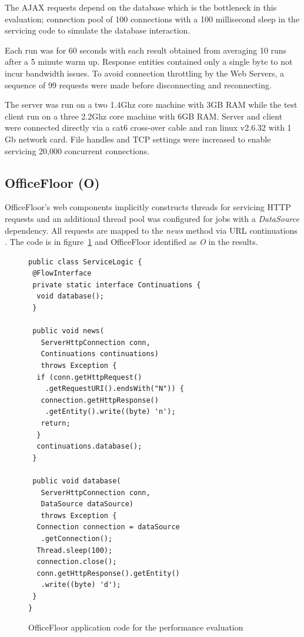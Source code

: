\documentclass[conference]{ieee/IEEEtran}
\begin{document}
The AJAX requests depend on the database which is the bottleneck in this
evaluation; connection pool of 100 connections with a 100 millisecond sleep in
the servicing code to simulate the database interaction.

Each run was for 60 seconds with each result obtained from averaging 10 runs
after a 5 minute warm up.  Response entities contained only a single byte to not
incur bandwidth issues.  To avoid connection throttling by the Web Servers, a
sequence of 99 requests were made before disconnecting and reconnecting.

The server was run on a two 1.4Ghz core machine with 3GB RAM while the test
client run on a three 2.2Ghz core machine with 6GB RAM.  Server and client were
connected directly via a cat6 cross-over cable and ran linux v2.6.32 with 1 Gb
network card.  File handles and TCP settings were increased to enable servicing
20,000 concurrent connections.

\subsection{OfficeFloor (O)}
OfficeFloor's web components implicitly constructs threads for servicing HTTP
requests and an additional thread pool was configured for jobs with a
\textit{DataSource} dependency.  All requests are mapped to the \textit{news}
method via URL continuations \cite{url-continuation}.  The code is in
figure~\ref{fig:officefloor_code} and OfficeFloor identified as \textit{O} in
the results.

\begin{figure}[!t]
\begin{verbatim}
public class ServiceLogic {
 @FlowInterface
 private static interface Continuations {
  void database();
 }

 public void news(
   ServerHttpConnection conn, 
   Continuations continuations) 
   throws Exception { 
  if (conn.getHttpRequest()
    .getRequestURI().endsWith("N")) {
   connection.getHttpResponse()
    .getEntity().write((byte) 'n');
   return;
  }
  continuations.database();
 }

 public void database(
   ServerHttpConnection conn,
   DataSource dataSource) 
   throws Exception {
  Connection connection = dataSource
   .getConnection();
  Thread.sleep(100);
  connection.close();
  conn.getHttpResponse().getEntity()
   .write((byte) 'd');
 }
}
\end{verbatim}
\caption{OfficeFloor application code for the performance evaluation}
\label{fig:officefloor_code}
\end{figure}
\end{document}
